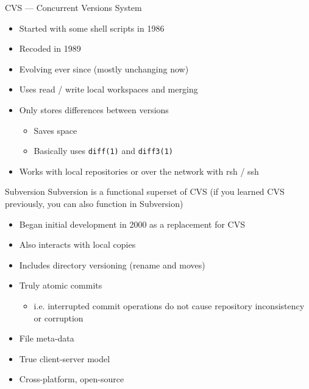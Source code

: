 \documentclass[onlymath, nologo]{beamer}
\begin{document}
  \begin{frame}{CVS --- Concurrent Versions System}
    \begin{itemize}
      \item Started with some shell scripts in 1986 \\[0.5em]
      \item Recoded in 1989 \\[0.5em]
      \item Evolving ever since (mostly unchanging now) \\[0.5em]
      \item Uses read / write local workspaces and merging \\[0.5em]
      \item Only stores differences between versions \\[0.25em]
      \begin{itemize}
        \item Saves space
        \item Basically uses \texttt{diff(1)} and \texttt{diff3(1)}
      \end{itemize}
      \item Works with local repositories or over the network with rsh / ssh
    \end{itemize}
  \end{frame}

  \begin{frame}{Subversion}
    Subversion is a functional superset of CVS (if you learned CVS previously, you can 
    also function in Subversion)
    \begin{itemize}
      \item Began initial development in 2000 as a replacement for CVS \\[0.5em] 
      \item Also interacts with local copies \\[0.5em]
      \item Includes directory versioning (rename and moves) \\[0.5em]
      \item Truly atomic commits \\[0.25em]
      \begin{itemize}
        \item i.e. interrupted commit operations do not cause repository inconsistency 
              or corruption
      \end{itemize}
      \item File meta-data \\[0.5em]
      \item True client-server model \\[0.5em] 
      \item Cross-platform, open-source
    \end{itemize}
  \end{frame}
\end{document}
